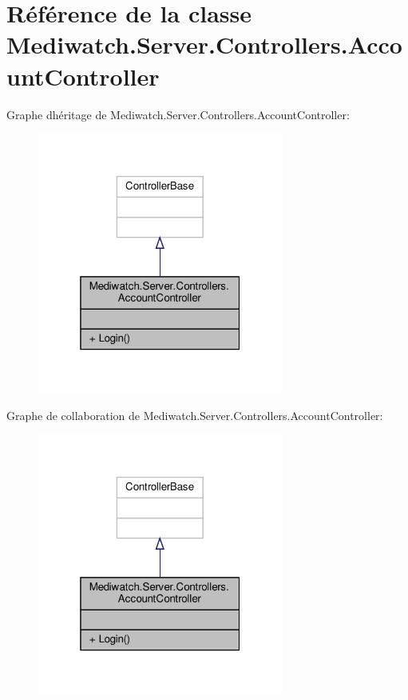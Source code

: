 \hypertarget{class_mediwatch_1_1_server_1_1_controllers_1_1_account_controller}{}\section{Référence de la classe Mediwatch.\+Server.\+Controllers.\+Account\+Controller}
\label{class_mediwatch_1_1_server_1_1_controllers_1_1_account_controller}


Graphe d\textquotesingle{}héritage de Mediwatch.\+Server.\+Controllers.\+Account\+Controller\+:
\nopagebreak
\begin{figure}[H]
\begin{center}
\leavevmode
\includegraphics[width=229pt]{class_mediwatch_1_1_server_1_1_controllers_1_1_account_controller__inherit__graph}
\end{center}
\end{figure}


Graphe de collaboration de Mediwatch.\+Server.\+Controllers.\+Account\+Controller\+:
\nopagebreak
\begin{figure}[H]
\begin{center}
\leavevmode
\includegraphics[width=229pt]{class_mediwatch_1_1_server_1_1_controllers_1_1_account_controller__coll__graph}
\end{center}
\end{figure}

